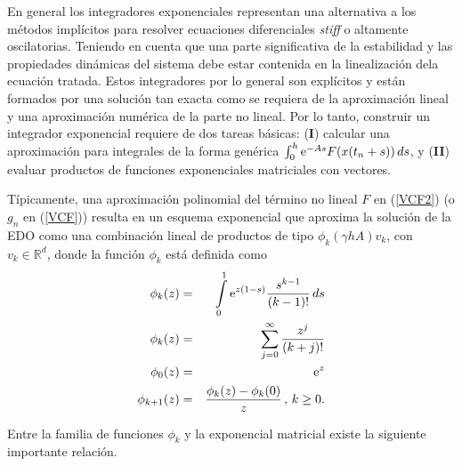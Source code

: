 En general los integradores exponenciales representan una alternativa a los métodos implícitos para resolver ecuaciones diferenciales \textit{stiff} o altamente oscilatorias. Teniendo en cuenta que una parte significativa de la estabilidad y las propiedades dinámicas del sistema debe estar contenida en la linealización dela ecuación tratada. Estos integradores por lo general son explícitos y están formados por una solución tan exacta como se requiera de la aproximación lineal y una aproximación numérica de la parte no lineal. Por lo tanto, construir un integrador exponencial requiere de dos tareas básicas: (\textbf{I}) calcular una aproximación para integrales de la forma 
genérica $\int_{0}^{h} \mathrm{e}^{-As}F(x(t_n+s)) \,ds$, y (\textbf{II}) evaluar productos de funciones exponenciales matriciales con vectores.

Típicamente, una aproximación polinomial del término no lineal $F$ en (\ref{VCF2}) (o $g_n$ en (\ref{VCF})) resulta en un esquema
exponencial que aproxima la solución de la EDO como una combinación lineal de productos de tipo $\phi_k(\gamma hA)v_k$, con 
$v_k\in \mathbb{R}^{d}$, donde la función $\phi_k$ está definida como
\begin{eqnarray}
    \phi_k(z) & = &\int\limits_{0}^{1}\mathrm{e}^{z(1-s)}\frac{s^{k-1}}{(k-1)!}\,ds \nonumber \\
    \phi_k(z) & = &\sum\limits_{j=0}^{\infty}\frac{z^{j}}{(k+j)!}\label{DEF-PHI}\\
    \phi_0(z) &=& \mathrm{e}^{z} \nonumber\\
    \phi_{k+1}(z) &=& \frac{\phi_k(z)-\phi_k(0)}{z}\,,\,k\geq0. \nonumber
\end{eqnarray}

Entre la familia de funciones $\phi_k$ y la exponencial matricial existe la siguiente importante relación.

